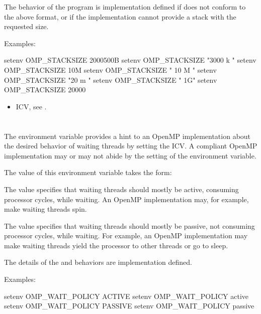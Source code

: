 The behavior of the program is implementation defined if  does not 
conform to the above format, or if the implementation cannot provide a stack with the 
requested size.

Examples:
\begin{boxedcode}
setenv OMP\_STACKSIZE 2000500B 
setenv OMP\_STACKSIZE "3000 k " 
setenv OMP\_STACKSIZE 10M 
setenv OMP\_STACKSIZE " 10 M "
setenv OMP\_STACKSIZE "20 m " 
setenv OMP\_STACKSIZE " 1G" 
setenv OMP\_STACKSIZE 20000 
\end{boxedcode}

\crossreferences
\begin{itemize}
\item {} ICV, see .
\end{itemize}









\section{}
\label{sec:OMP_WAIT_POLICY}
The  environment variable provides a hint to an OpenMP 
implementation about the desired behavior of waiting threads by setting the 
 ICV. A compliant OpenMP implementation may or may not abide by the setting of 
the environment variable.

The value of this environment variable takes the form:


The  value specifies that waiting threads should mostly be active, consuming 
processor cycles, while waiting. An OpenMP implementation may, for example, make 
waiting threads spin. 

The  value specifies that waiting threads should mostly be passive, not 
consuming processor cycles, while waiting. For example, an OpenMP implementation 
may make waiting threads yield the processor to other threads or go to sleep.

The details of the  and  behaviors are implementation defined. 

Examples:
\begin{boxedcode}
setenv OMP\_WAIT\_POLICY ACTIVE 
setenv OMP\_WAIT\_POLICY active 
setenv OMP\_WAIT\_POLICY PASSIVE 
setenv OMP\_WAIT\_POLICY passive 
\end{boxedcode}

